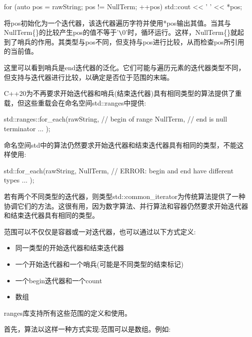 \begin{cpp}
for (auto pos = rawString; pos != NullTerm{}; ++pos) {
	std::cout << ' ' << *pos;
}
\end{cpp}

将pos初始化为一个迭代器，该迭代器遍历字符并使用*pos输出其值。当其与NullTerm\{\}的比较产生pos的值不等于'\verb|\|0'时，循环运行。这样，NullTerm\{\}就起到了哨兵的作用。其类型与pos不同，但支持与pos进行比较，从而检查pos所引用的当前值。

这里可以看到哨兵是end迭代器的泛化。它们可能与遍历元素的迭代器类型不同，但支持与迭代器进行比较，以确定是否位于范围的末端。


C++20为不再要求开始迭代器和哨兵(结束迭代器)具有相同类型的算法提供了重载，但这些重载会在命名空间std::ranges中提供:

\begin{cpp}
std::ranges::for_each(rawString, // begin of range
						NullTerm{}, // end is null terminator
						... );
\end{cpp}

命名空间std中的算法仍然要求开始迭代器和结束迭代器具有相同的类型，不能这样使用:

\begin{cpp}
std::for_each(rawString, NullTerm{}, // ERROR: begin and end have different types
			... );
\end{cpp}

若有两个不同类型的迭代器，则类型std::common\_iterator为传统算法提供了一种协调它们的方法。这很有用，因为数字算法、并行算法和容器仍然要求开始迭代器和结束迭代器具有相同的类型。


范围可以不仅仅是容器或一对迭代器，也可以通过以下方式定义:

\begin{itemize}
\item
同一类型的开始迭代器和结束迭代器

\item
一个开始迭代器和一个哨兵(可能是不同类型的结束标记)

\item
一个begin迭代器和一个count

\item
数组
\end{itemize}

ranges库支持所有这些范围的定义和使用。

首先，算法以这样一种方式实现:范围可以是数组。例如:

